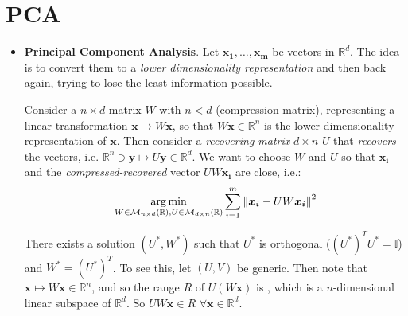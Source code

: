 \documentclass[../template.tex]{subfiles}
\begin{document}
\section{PCA}
\begin{itemize}
    \item \textbf{Principal Component Analysis}. Let $\bm{x_1}, \dots, \bm{x_m}$ be vectors in $\mathbb{R}^d$. The idea is to convert them to a \textit{lower dimensionality representation} and then back again, trying to lose the least information possible. 
    
    Consider a $n\times d$ matrix $W$ with $n < d$ (compression matrix), representing a linear transformation $\bm{x} \mapsto W \bm{x}$, so that $W \bm{x} \in \mathbb{R}^n$ is the lower dimensionality representation of $\bm{x}$. Then consider a \textit{recovering matrix} $d \times n$ $U$ that \textit{recovers} the vectors, i.e. $\mathbb{R}^n \ni \bm{y} \mapsto U\bm{y} \in \mathbb{R}^d$. We want to choose $W$ and $U$ so that $\bm{x_i}$ and the \textit{compressed-recovered} vector $UW\bm{x_i}$ are close, i.e.:
    \begin{align} \label{eqn:PCA-problem}
        \underset{W \in \mathcal{M}_{n\times d}(\mathbb{R}), U\in \mathcal{M}_{d \times n}(\mathbb{R})}{\arg\min} \sum_{i=1}^m \norm{\bm{x_i} - UW \bm{x_i}}^2
    \end{align}

    There exists a solution $(U^*, W^*)$ such that $U^*$ is orthogonal ($(U^*)^T U^* = \mathbb{I}$) and $W^* = (U^*)^T$. To see this, let $(U,V)$ be generic. Then note that $\bm{x} \mapsto W\bm{x} \in \mathbb{R}^n$, and so the range $R$ of $U (W\bm{x})$ is , which is a $n$-dimensional linear subspace of $\mathbb{R}^d$.
    So $UW\bm{x} \in R$ $\forall \bm{x} \in \mathbb{R}^d$.


\end{itemize}
\end{document}
